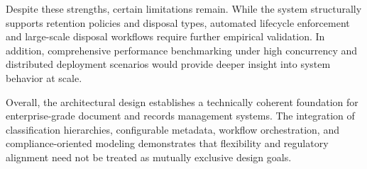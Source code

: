 Despite these strengths, certain limitations remain. 
While the system structurally supports retention policies and disposal types, automated lifecycle enforcement and large-scale disposal workflows require further empirical validation. 
In addition, comprehensive performance benchmarking under high concurrency and distributed deployment scenarios would provide deeper insight into system behavior at scale.

Overall, the architectural design establishes a technically coherent foundation for enterprise-grade document and records management systems. 
The integration of classification hierarchies, configurable metadata, workflow orchestration, and compliance-oriented modeling demonstrates that flexibility and regulatory alignment need not be treated as mutually exclusive design goals.
